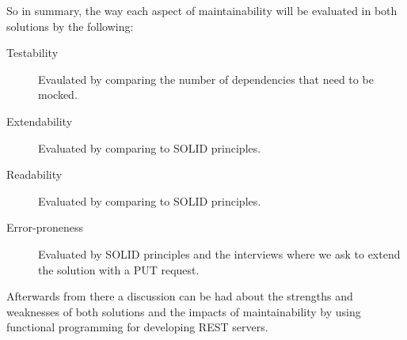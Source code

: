 So in summary, the way each aspect of maintainability will be evaluated in both
solutions by the following:

\begin{description}
    \item [Testability] Evaulated by comparing the number of dependencies that
    need to be mocked. 
    \item [Extendability] Evaluated by comparing to SOLID principles.
    \item [Readability] Evaluated by comparing to SOLID principles.
    \item [Error-proneness] Evaluated by SOLID principles and the interviews
        where we ask to extend the solution with a PUT request.
\end{description}

Afterwards from there a discussion can be had about the strengths and weaknesses
of both solutions and the impacts of maintainability by using functional
programming for developing REST servers.






